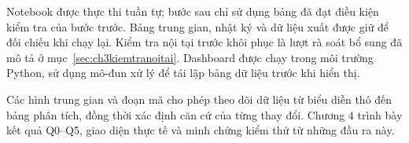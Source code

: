 Notebook được thực thi tuần tự; bước sau chỉ sử dụng bảng đã đạt điều kiện kiểm tra của bước trước. Bảng trung gian, nhật ký và dữ liệu xuất được giữ để đối chiếu khi chạy lại. Kiểm tra nội tại trước khôi phục là lượt rà soát bổ sung đã mô tả ở mục~\ref{sec:ch3kiemtranoitai}. Dashboard được chạy trong môi trường Python, sử dụng mô-đun xử lý để tái lập bảng dữ liệu trước khi hiển thị.

Các hình trung gian và đoạn mã cho phép theo dõi dữ liệu từ biểu diễn thô đến bảng phân tích, đồng thời xác định căn cứ của từng thay đổi. Chương 4 trình bày kết quả Q0--Q5, giao diện thực tế và minh chứng kiểm thử từ những đầu ra này.
